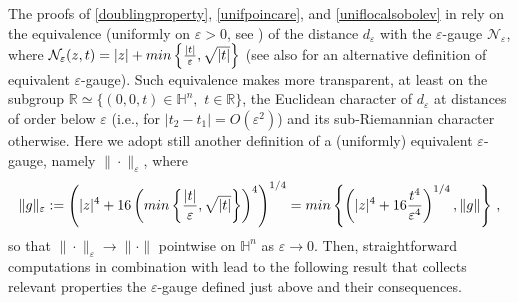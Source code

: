 \documentclass[10pt]{amsart}
\numberwithin{equation}{section}
\theoremstyle{definition}
\newcommand{\He}{\mathbb{H}}
\begin{document}
The proofs of \eqref{doublingproperty}, \eqref{unifpoincare}, and \eqref{uniflocalsobolev} in \cite{DoMaRi} rely on the equivalence  (uniformly on $\varepsilon >0$, see \cite[Corollary 3.9]{DoMaRi} ) of the distance $d_\varepsilon$ with the $\varepsilon$-gauge $\mathcal{N}_\varepsilon$, where $\mathcal{N}_\varepsilon(z,t)=|z|+{\rm min} \left\{ \frac{|t|}{\varepsilon}, \sqrt{|t|} \right\}$ (see also \cite{CapoCitti3} for an alternative  definition of equivalent $\varepsilon$-gauge). Such equivalence makes more transparent, at least on the subgroup $\mathbb{R} \simeq \{ (0,0,t) \in \He^n, \, \, t \in \mathbb{R}\}$, the Euclidean character of $d_\varepsilon$ at distances of order below $\varepsilon$ (i.e., for $|t_2-t_1|=O(\varepsilon^2)$) and its sub-Riemannian character otherwise. Here we adopt still another  definition of a (uniformly) equivalent $\varepsilon$-gauge, namely $\| \cdot \|_\varepsilon$, where 
\begin{equation}
\label{eps-gauge}
\| g\|_\varepsilon:=\left( |z|^4 + 16  \left({\rm min} \left\{ \frac{|t|}{\varepsilon}, \sqrt{|t|} \right\}\right)^4 \right)^{1/4}={\rm min} \left\{  \left( |z|^4 + 16   \frac{t^4}{\varepsilon^4} \right)^{1/4} ,  \|g\| \right\} \, ,
\end{equation}
so that $\| \cdot\|_\varepsilon \to \| \cdot \|$ pointwise on $\He^n$ as $\varepsilon \to 0$. Then, straightforward computations in combination with \cite[Corollary 3.7 and Corollary 3.9]{DoMaRi} lead to the following result that collects relevant properties the $\varepsilon$-gauge defined just above and their consequences.
\end{document}
